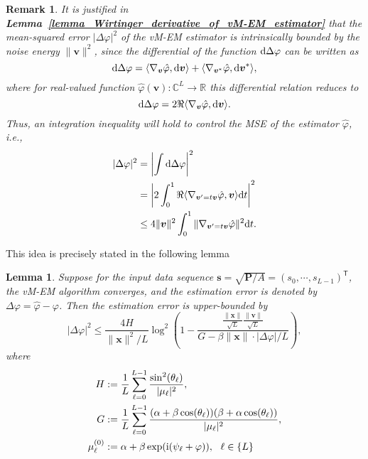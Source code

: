 \documentclass[a4paper,12pt]{article}
\newtheorem{lemma}{\bf Lemma}
\newtheorem{remark}{\bf Remark}
\def \T {^{\mathsf{T}}}
\def \ri {{\rm i}}
\begin{document}
\begin{remark}
    It is justified in {\bf Lemma~\ref{lemma_Wirtinger_derivative_of_vM-EM_estimator}} that the mean-squared error $|\Delta\varphi|^2$ of the vM-EM estimator is intrinsically bounded by the noise energy $\|{\bm v}\|^2$, since the differential of the function ${\rm d}\Delta\varphi$ can be written as 
    \begin{equation}
        {\rm d}\Delta\varphi = \langle \nabla_{\bm v}\hat{\varphi}, {\rm d}{\bm v}\rangle + \langle \nabla_{{\bm v}^*}\hat{\varphi}, {\rm d}{\bm v}^*\rangle, 
    \end{equation}
    where for real-valued function $\hat{\varphi}({\bm v}): \mathbb{C}^L \to \mathbb{R}$ this differential relation reduces to 
    \begin{equation}
        {\rm d}\Delta\varphi = 2\Re\langle\nabla_{\bm v}\hat{\varphi}, {\rm d}{\bm v}\rangle. 
    \end{equation}
    Thus, an integration inequality will hold to control the MSE of the estimator $\hat{\varphi}$, i.e., 
    \begin{equation}
        \begin{aligned}
            |\Delta{\varphi}|^2 &= \left| \int {\rm d}\Delta\varphi \right|^2 \\
            &= \left| 2\int_{0}^{1} \Re\langle\nabla_{{\bm v}'=t {\bm v}}\hat{\varphi}, {\bm v}\rangle{\rm d}t \right|^2 \\
            &\leq 4\|{\bm v}\|^2 \int_{0}^{1} \|\nabla_{{\bm v}'=t{\bm v}}\hat{\varphi} \|^2 {\rm d} t. 
        \end{aligned}
    \end{equation}
\end{remark}
This idea is precisely stated in the following lemma 

\begin{lemma}
    Suppose for the input data sequence ${\bm s} = \sqrt{{\bm P}/A} = (s_0, \cdots, s_{L-1})\T$, the vM-EM algorithm converges, and the estimation error is denoted by $\Delta\varphi = \hat{\varphi} - \varphi$. Then the estimation error is upper-bounded by
    \begin{equation}
        |\Delta\varphi|^2 \leq  \frac{4H}{\|{\bm x}\|^2/ L} \log^2 \left(1-\frac{\frac{\|{\bm x}\|}{\sqrt{L}}\frac{\|{\bm v}\|}{\sqrt{L}}}{G-\beta\|{\bm x}\| \cdot |\Delta\varphi|/L}\right), \label{eqn:MSE-upper-bound}
    \end{equation} 
    where 
    \begin{equation}
        \begin{aligned}
            H & :=\frac{1}{L}\sum_{\ell=0}^{L-1} \frac{\sin^2(\theta_\ell)}{|\mu_\ell|^2}, \\
            G & := \frac{1}{L}\sum_{\ell=0}^{L-1} \frac{(\alpha+\beta \cos(\theta_\ell))(\beta+\alpha\cos(\theta_\ell))}{|\mu_\ell|^2}, \\
            \mu_\ell^{(0)} &:= \alpha +\beta\exp(\ri(\psi_\ell + \varphi)),~~\ell\in\{L\}\\
        \end{aligned}
    \end{equation}
\end{lemma}
\end{document}
